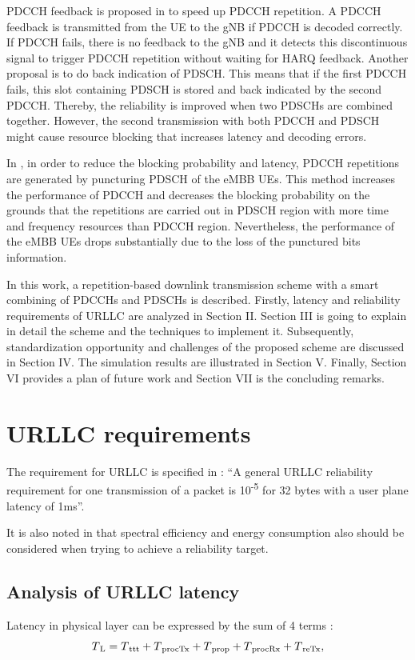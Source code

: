 \documentclass[conference]{IEEEtran}
\begin{document}
PDCCH feedback is proposed in \cite{b4} to speed up PDCCH repetition. A PDCCH feedback is transmitted from the UE to the gNB if PDCCH is decoded correctly. If PDCCH fails, there is no feedback to the gNB and it detects this discontinuous signal to trigger PDCCH repetition without waiting for HARQ feedback. Another proposal is to do back indication of PDSCH. This means that if the first PDCCH fails, this slot containing PDSCH is stored and back indicated by the second PDCCH. Thereby, the reliability is improved when two PDSCHs are combined together. However, the second transmission with both PDCCH and PDSCH might cause resource blocking that increases latency and decoding errors.

In \cite{b5}, in order to reduce the blocking probability and latency, PDCCH repetitions are generated by puncturing PDSCH of the eMBB UEs. This method increases the performance of PDCCH and decreases the blocking probability on the grounds that the repetitions are carried out in PDSCH region with more time and frequency resources than PDCCH region. Nevertheless, the performance of the eMBB UEs drops substantially due to the loss of the punctured bits\textquotesingle \, information.

In this work, a repetition-based downlink transmission scheme with a smart combining of PDCCHs and PDSCHs is described. Firstly, latency and reliability requirements of URLLC are analyzed in Section II. Section III is going to explain in detail the scheme and the techniques to implement it. Subsequently, standardization opportunity and challenges of the proposed scheme are discussed in Section IV. The simulation results are illustrated in Section V. Finally, Section VI provides a plan of future work and Section VII is the concluding remarks.

\section{URLLC requirements}
The requirement for URLLC is specified in \cite{b6}: ``A general URLLC reliability requirement for one transmission of a packet is 10\textsuperscript{-5} for 32 bytes with a user plane latency of 1ms''.

It is also noted in \cite{b6} that spectral efficiency and energy consumption also should be considered when trying to achieve a reliability target. 
\subsection{Analysis of URLLC latency}
Latency in physical layer can be expressed by the sum of 4 terms \cite{ad1}:
\begin{equation}
T\textsubscript{L}= T\textsubscript{ttt} + T\textsubscript{procTx} + T\textsubscript{prop} + T\textsubscript{procRx} + T\textsubscript{reTx},\label{eq1}
\end{equation}
\end{document}

